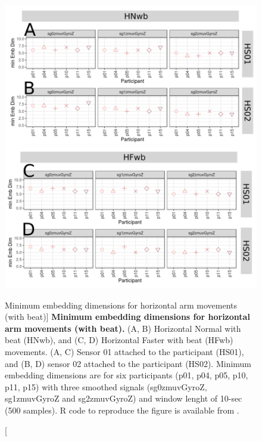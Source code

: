 \begin{figure}
\centering
\includegraphics[width=1.0\textwidth]{cao_Hwb_w10}
	\caption
	[Minimum embedding dimensions for horizontal arm movements 
	(with beat)]{
	{\bf Minimum embedding dimensions for horizontal arm movements 
	(with beat).} 
		(A, B) Horizontal Normal with beat (HNwb), and
		(C, D) Horizontal Faster with beat (HFwb) movements.
		(A, C) Sensor 01 attached to the participant (HS01), and
		(B, D) sensor 02 attached to the participant (HS02).
		Minimum embedding dimensions are for six participants 
		(p01, p04, p05, p10, p11, p15) with three smoothed signals 
		(sg0zmuvGyroZ, sg1zmuvGyroZ and sg2zmuvGyroZ)
		and window lenght of 10-sec (500 samples).
		R code to reproduce the figure is available 
		from \cite{xochicale2018}.
        }
    \label{fig:caoHwb}
\end{figure}


